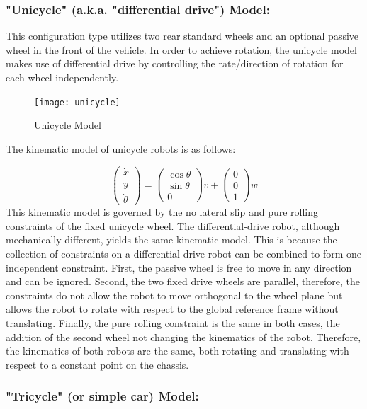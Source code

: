 \documentclass[twoside]{article}
\begin{document}
\subsubsection*{"Unicycle" (a.k.a. "differential drive") Model:}

This configuration type utilizes two rear standard wheels and an optional passive wheel in the front of the vehicle. In order to achieve rotation, the unicycle model makes use of differential drive by controlling the rate/direction of rotation for each wheel independently\cite{sns}.

\begin{figure}[H]
\centering
\texttt{[image: unicycle]}
\caption{Unicycle Model}
\end{figure}

The kinematic model of unicycle robots is as follows:

\[ \begin{pmatrix}
\dot{x} \\ \dot{y} \\ \dot{\theta}
\end{pmatrix} =
\begin{pmatrix} \cos \theta \\ \sin \theta \\ 0 \end{pmatrix} v + \begin{pmatrix} 0 \\ 0 \\ 1 \end{pmatrix} w
\]
This kinematic model is governed by the no lateral slip and pure rolling constraints of the fixed unicycle wheel. The differential-drive robot, although mechanically different, yields the same kinematic model. This is because the collection of constraints on a differential-drive robot can be combined to form one independent constraint. First, the passive wheel is free to move in any direction and can be ignored. Second, the two fixed drive wheels are parallel, therefore, the constraints do not allow the robot to move orthogonal to the wheel plane but allows the robot to rotate with respect to the global reference frame without translating. Finally, the pure rolling constraint is the same in both cases, the addition of the second wheel not changing the kinematics of the robot. Therefore, the kinematics of both robots are the same, both rotating and translating with respect to a constant point on the chassis.

\subsubsection*{"Tricycle" (or simple car) Model:}
\end{document}
